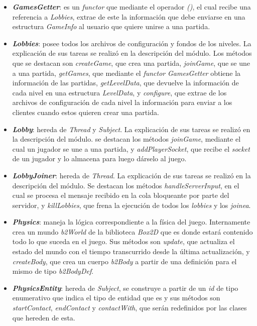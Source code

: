 \begin{itemize}
	\item \textbf{\textit{GamesGetter}}: es un \textit{functor} que mediante el operador \textit{()}, el cual recibe una referencia a \textit{Lobbies}, extrae de este la información que debe enviarse en una estructura \textit{GameInfo} al usuario que quiere unirse a una partida.
	
	\item \textbf{\textit{Lobbies}}: posee todos los archivos de configuración y fondos de los niveles. La explicación de sus tareas se realizó en la descripción del módulo. Los métodos que se destacan son \textit{createGame}, que crea una partida, \textit{joinGame}, que se une a una partida, \textit{getGames}, que mediante el \textit{functor} \textit{GamesGetter} obtiene la información de las partidas, \textit{getLevelData}, que devuelve la información de cada nivel en una estructura \textit{LevelData}, y \textit{configure}, que extrae de los archivos de configuración de cada nivel la información para enviar a los clientes cuando estos quieren crear una partida.
	
	\item \textbf{\textit{Lobby}}: hereda de \textit{Thread} y \textit{Subject}. La explicación de sus tareas se realizó en la descripción del módulo. se destacan los métodos \textit{joinGame}, mediante el cual un jugador se une a una partida, y \textit{addPlayerSocket}, que recibe el \textit{socket} de un jugador y lo almacena para luego dárselo al juego.
	
	\item \textbf{\textit{LobbyJoiner}}: hereda de \textit{Thread}. La explicación de sus tareas se realizó en la descripción del módulo. Se destacan los métodos \textit{handleServerInput}, en el cual se procesa el mensaje recibido en la cola bloqueante por parte del servidor, y \textit{killLobbies}, que frena la ejecución de todos los \textit{lobbies} y los \textit{joinea}.
	
	\item \textbf{\textit{Physics}}: maneja la lógica correspondiente a la física del juego. Internamente crea un mundo \textit{b2World} de la biblioteca \textit{Box2D} que es donde estará contenido todo lo que suceda en el juego. Sus métodos son \textit{update}, que actualiza el estado del mundo con el tiempo transcurrido desde la última actualización, y \textit{createBody}, que crea un cuerpo \textit{b2Body} a partir de una definición para el mismo de tipo \textit{b2BodyDef}.
	
	\item \textbf{\textit{PhysicsEntity}}: hereda de \textit{Subject}, se construye a partir de un \textit{id} de tipo enumerativo que indica el tipo de entidad que es y sus métodos son \textit{startContact}, \textit{endContact} y \textit{contactWith}, que serán redefinidos por las clases que hereden de esta.
	

\end{itemize}
